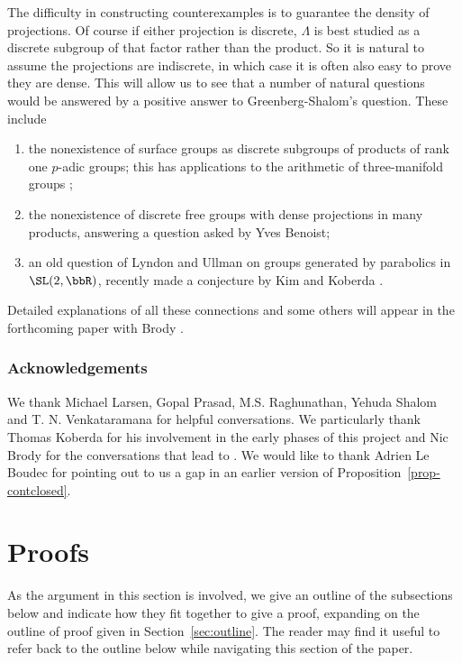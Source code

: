 The difficulty in constructing counterexamples is to guarantee the density of projections. Of course if either
projection is discrete, $\Lambda$ is best studied as a discrete subgroup of that factor rather than the product. So it is natural to assume the projections are indiscrete, in which case it is often also easy to prove they are dense. This will allow
us to see that a number of natural questions would be answered by a positive answer to Greenberg-Shalom's question. These include

\begin{enumerate}
\item the nonexistence of surface groups as discrete subgroups of products of rank one $p$-adic groups; this has applications to the arithmetic of three-manifold groups \cite{FLSS};
\item the nonexistence of discrete free groups with dense projections in many products, answering a question asked by Yves Benoist;
\item an old question of Lyndon and Ullman on groups generated by parabolics in $\SL(2,\bbR)$, recently made a conjecture by Kim and Koberda \cite{lyndon-ullman, kim-koberda-notfree}.
\end{enumerate}

Detailed explanations of all these connections and some others will appear in the forthcoming paper with Brody \cite{BFMVL}.

\subsubsection*{Acknowledgements} We thank Michael Larsen, Gopal Prasad, M.S. Raghunathan, Yehuda Shalom and T. N. Venkataramana for helpful conversations. We particularly thank Thomas Koberda for his involvement in the early phases of this project and Nic Brody for the conversations that lead to \cite{BFMVL}. We would like to thank Adrien Le Boudec for pointing out to us a gap in
an earlier version of Proposition~\ref{prop-contclosed}.

\section{Proofs}\label{sec:proof}

As the argument in this section is involved, we give an outline of the subsections
below and indicate how they fit together to give a proof, expanding on the outline of proof given in Section~\ref{sec:outline}. The reader may find it useful to refer back to the outline below while
navigating this section of the paper.

